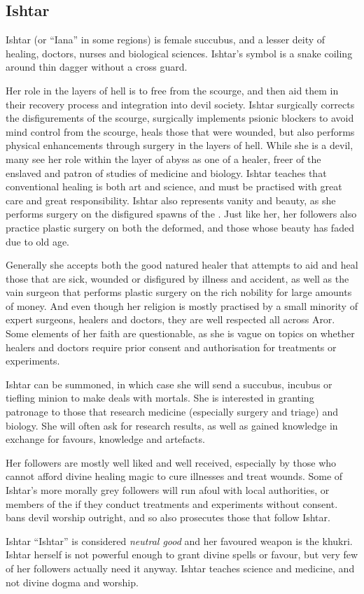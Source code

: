 \subsection{Ishtar}
\label{sec:Ishtar}

Ishtar (or ``Iana'' in some regions) is female succubus, and a lesser deity of
healing, doctors, nurses and biological sciences. Ishtar's symbol is a snake
coiling around thin dagger without a cross guard.

Her role in the layers of hell is to free  from the
scourge, and then aid them in their recovery process and integration into
devil society. Ishtar surgically corrects the disfigurements of the scourge,
surgically implements psionic blockers to avoid mind control from the scourge,
heals those that were wounded, but also performs physical enhancements through
surgery in the layers of hell. While she is a devil, many see her role within
the layer of abyss as one of a healer, freer of the enslaved and patron of
studies of medicine and biology. Ishtar teaches that conventional healing is
both art and science, and must be practised with great care and great
responsibility.  Ishtar also represents vanity and beauty, as she performs
surgery on the disfigured spawns of the . Just like her,
her followers also practice plastic surgery on both the deformed, and those
whose beauty has faded due to old age.

Generally she accepts both the good natured healer that attempts to aid and
heal those that are sick, wounded or disfigured by illness and accident, as
well as the vain surgeon that performs plastic surgery on the rich nobility
for large amounts of money. And even though her religion is mostly practised
by a small minority of expert surgeons, healers and doctors, they are well
respected all across Aror. Some elements of her faith are questionable, as she
is vague on topics on whether healers and doctors require prior consent and
authorisation for treatments or experiments.

Ishtar can be summoned, in which case she will send a succubus, incubus or
tiefling minion to make deals with mortals. She is interested in granting
patronage to those that research medicine (especially surgery and triage) and
biology. She will often ask for research results, as well as gained knowledge
in exchange for favours, knowledge and artefacts.

Her followers are mostly well liked and well received, especially by those who
cannot afford divine healing magic to cure illnesses and treat wounds. Some of
Ishtar's more morally grey followers will run afoul with local authorities, or
members of the  if they conduct treatments and experiments
without consent.  bans devil worship outright, and so also
prosecutes those that follow Ishtar.

\begin{35e}{Ishtar}
  ``Ishtar'' is considered \emph{neutral good} and her favoured weapon is the
  khukri. Ishtar herself is not powerful enough to grant divine spells or
  favour, but very few of her followers actually need it anyway. Ishtar
  teaches science and medicine, and not divine dogma and worship.
\end{35e}
